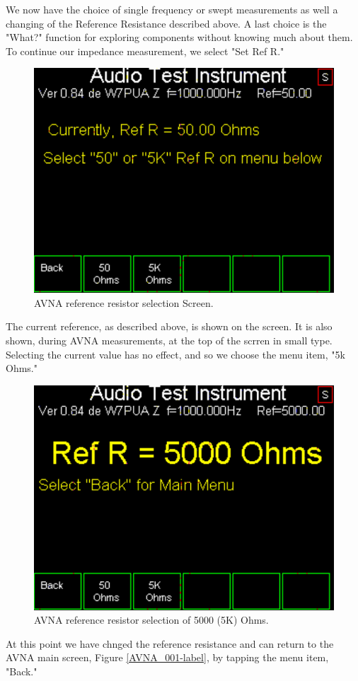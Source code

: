 %
We now have the choice  of single frequency or swept measurements as well a changing of the Reference Resistance described above. A last choice is the "What?" function for exploring components without knowing much about them. To continue our impedance measurement, we select "Set Ref R."
\begin{figure}[H]
\begin{center}
\includegraphics[scale=0.75]{./images/AVNA_003.pdf}
\caption{AVNA reference resistor selection  Screen.}
\label{AVNA_003-label}
\end{center}
\end{figure}
%
The current reference, as described above, is shown on the screen. It is also shown, during AVNA measurements, at the top of the scrren in small type. Selecting the current value has no effect, and so we choose the menu item, "5k Ohms."
\begin{figure}[H]
\begin{center}
\includegraphics[scale=0.75]{./images/AVNA_004.pdf}
\caption{AVNA reference resistor selection of 5000 (5K) Ohms.}
\label{AVNA_004-label}
\end{center}
\end{figure}
At this point we have chnged the reference resistance and can return to the AVNA main screen, Figure \ref{AVNA_001-label}, by tapping the menu item, "Back."

